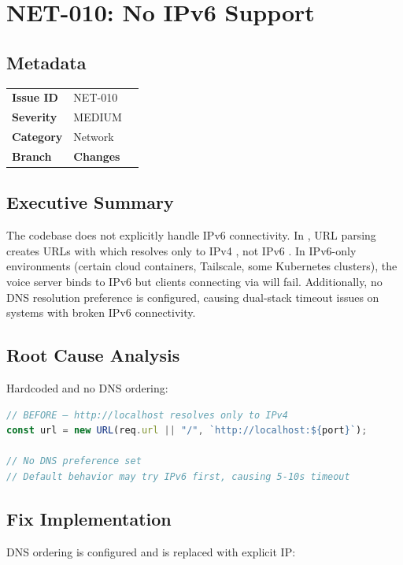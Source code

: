 \section{NET-010: No IPv6 Support}
\label{sec:net-010}
\subsection*{Metadata}
\begin{tabular}{ll}
\textbf{Issue ID} & NET-010 \\
\textbf{Severity} & MEDIUM \\
\textbf{Category} & Network \\
\textbf{Branch} & 
\textbf{Changes} &  \\
\end{tabular}

\subsection*{Executive Summary}
The codebase does not explicitly handle IPv6 connectivity. In , URL parsing creates URLs with  which resolves only to IPv4 , not IPv6 . In IPv6-only environments (certain cloud containers, Tailscale, some Kubernetes clusters), the voice server binds to IPv6 but clients connecting via  will fail. Additionally, no DNS resolution preference is configured, causing dual-stack timeout issues on systems with broken IPv6 connectivity.

\subsection*{Root Cause Analysis}
Hardcoded  and no DNS ordering:

\begin{lstlisting}[language=TypeScript]
// BEFORE — http://localhost resolves only to IPv4
const url = new URL(req.url || "/", `http://localhost:${port}`);

// No DNS preference set
// Default behavior may try IPv6 first, causing 5-10s timeout
\end{lstlisting}

\subsection*{Fix Implementation}
DNS ordering is configured and  is replaced with explicit IP:

